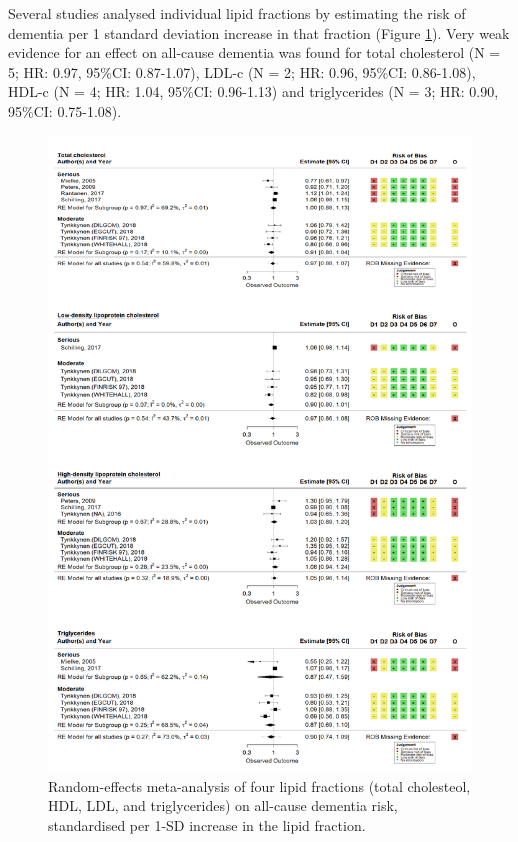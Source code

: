 \documentclass[a4paper, twoside]{templates/ociamthesis}
\begin{document}
Several studies analysed individual lipid fractions by estimating the risk of dementia per 1 standard deviation increase in that fraction (Figure \ref{fig:lipidFractionsDementia}). Very weak evidence for an effect on all-cause dementia was found for total cholesterol (N = 5; HR: 0.97, 95\%CI: 0.87-1.07), LDL-c (N = 2; HR: 0.96, 95\%CI: 0.86-1.08), HDL-c (N = 4; HR: 1.04, 95\%CI: 0.96-1.13) and triglycerides (N = 3; HR: 0.90, 95\%CI: 0.75-1.08).





\begin{figure}[H]
\includegraphics[width=1\linewidth]{figures/sys-rev/fp_lipids_composite_Dementia} \caption[Random-effects meta-analysis of four lipid fractions on all-cause dementia]{Random-effects meta-analysis of four lipid fractions (total cholesteol, HDL, LDL, and triglycerides) on all-cause dementia risk, standardised per 1-SD increase in the lipid fraction.}\label{fig:lipidFractionsDementia}
\end{figure}
\end{document}
